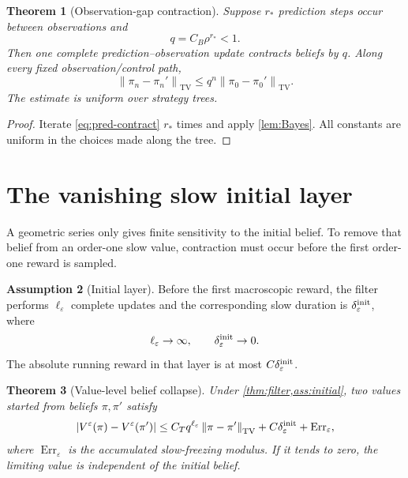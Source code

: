 \documentclass[11pt,reqno]{amsart}
\newtheorem{theorem}{Theorem}[section]
\theoremstyle{definition}
\newtheorem{assumption}[theorem]{Assumption}
\theoremstyle{remark}
\newcommand{\TV}{\mathrm{TV}}
\newcommand{\norm}[1]{\left\lVert #1\right\rVert}
\newcommand{\abs}[1]{\left\lvert #1\right\rvert}
\begin{document}
\begin{theorem}[Observation-gap contraction]\label{thm:filter}
Suppose $r_*$ prediction steps occur between observations and
\begin{equation}\label{eq:q}
 q=C_B\rho^{r_*}<1.
\end{equation}
Then one complete prediction--observation update contracts beliefs by $q$.
Along every fixed observation/control path,
\[
 \norm{\pi_n-\pi_n'}_{\TV}
 \le q^n\norm{\pi_0-\pi_0'}_{\TV}.
\]
The estimate is uniform over strategy trees.
\end{theorem}

\begin{proof}
Iterate \eqref{eq:pred-contract} $r_*$ times and apply
\cref{lem:Bayes}.  All constants are uniform in the choices made along the
tree.
\end{proof}

\section{The vanishing slow initial layer}\label{sec:initial}

A geometric series only gives finite sensitivity to the initial belief.  To
remove that belief from an order-one slow value, contraction must occur before
the first order-one reward is sampled.

\begin{assumption}[Initial layer]\label{ass:initial}
Before the first macroscopic reward, the filter performs
$\ell_\varepsilon$ complete updates and the corresponding slow duration is
$\delta_\varepsilon^{\rm init}$, where
\[
 \ell_\varepsilon\to\infty,
 \qquad
 \delta_\varepsilon^{\rm init}\to0.
\]
The absolute running reward in that layer is at most
$C\delta_\varepsilon^{\rm init}$.
\end{assumption}

\begin{theorem}[Value-level belief collapse]\label{thm:value-collapse}
Under \cref{thm:filter,ass:initial}, two values started from beliefs
$\pi,\pi'$ satisfy
\begin{equation}\label{eq:value-collapse}
 \abs{V^\varepsilon(\pi)-V^\varepsilon(\pi')}
 \le C_Tq^{\ell_\varepsilon}
       \norm{\pi-\pi'}_{\TV}
 +C\delta_\varepsilon^{\rm init}
 +\operatorname{Err}_\varepsilon,
\end{equation}
where $\operatorname{Err}_\varepsilon$ is the accumulated slow-freezing
modulus.  If it tends to zero, the limiting value is independent of the initial
belief.
\end{theorem}
\end{document}
